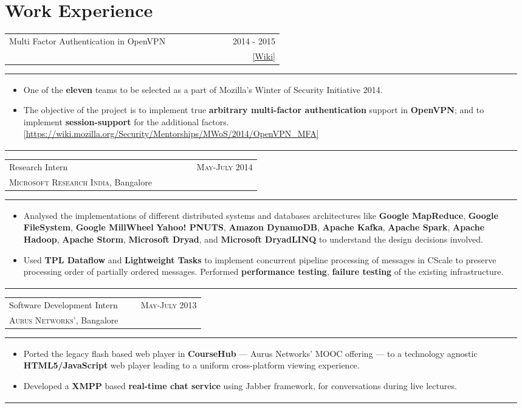 \documentclass[a4paper]{article} %
\newcommand{\cproject}[5]{
    \begin{tabular}{p{0.60\linewidth}r}
        \textcolor{NavyBlue}{\small #2} & \multicolumn{1}{m{7.3cm}}{\raggedleft \small {\textsc{#1}}}\\
        \small {#3} & \small {#4}
    \end{tabular}
    \begin{tabular}{p{0.98\linewidth}}
    \vspace{-0.3cm}
        \footnotesize {#5}
    \end{tabular}
    \vspace{-0.45cm}
}
\begin{document}
\section{Work Experience}
\cproject
    {2014 - 2015}
    {Multi Factor Authentication in OpenVPN}
    {\textsc{\raggedright Mozilla Winter of Security}, Guillaume Destuynder and Professor Dheeraj Sanghi}
    {\href{https://wiki.mozilla.org/Security/Mentorships/MWoS/2014/OpenVPN\_MFA} {[Wiki]} }
    {
      \begin{itemize}[leftmargin=0.5cm]
          \item One of the \textbf{eleven} teams to be selected as a part of Mozilla's Winter of Security Initiative 2014.
          \item The objective of the project is to implement true \textbf{arbitrary multi-factor authentication} support in
              \textbf{OpenVPN}; and to implement \textbf{session-support} for the additional factors.
              \href{https://wiki.mozilla.org/Security/Mentorships/MWoS/2014/OpenVPN\_MFA} {[https://wiki.mozilla.org/Security/Mentorships/MWoS/2014/OpenVPN\_MFA]}
      \end{itemize}
    }


\cproject
      {May-July 2014}
      {Research Intern}
      {\textsc{Microsoft Research India}, Bangalore}
      {}
      {
         \begin{itemize}[leftmargin=0.5cm]
             \item Analysed the implementations of different distributed systems and databases architectures like
                 \textbf{Google MapReduce}, \textbf{Google FileSystem}, \textbf{Google MillWheel} \textbf{Yahoo! PNUTS},
                 \textbf{Amazon DynamoDB}, \textbf{Apache Kafka}, \textbf{Apache Spark}, \textbf{Apache Hadoop},
                 \textbf{Apache Storm}, \textbf{Microsoft Dryad}, and \textbf{Microsoft DryadLINQ}
                 to understand the design decisions involved.
             \item Used \textbf{TPL Dataflow} and \textbf{Lightweight Tasks} to implement concurrent pipeline
                 processing of messages in CScale to preserve processing order of partially ordered messages.
                 Performed \textbf{performance testing}, \textbf{failure testing} of the existing infrastructure.
         \end{itemize}
     }

\cproject
    {May-July 2013}
    {Software Development Intern}
    {\textsc{Aurus Networks'}, Bangalore}
    {}
    {
        \begin{itemize}[leftmargin=0.5cm]
            \item Ported the legacy flash based web player in \textbf{CourseHub} --- Aurus Networks'
                MOOC offering --- to a technology agnostic \textbf{HTML5/JavaScript} web player leading
                to a uniform cross-platform viewing experience.
            \item Developed a \textbf{XMPP} based \textbf{real-time chat service} using Jabber framework,
                for conversations during live lectures.
        \end{itemize}
    }
\end{document}
